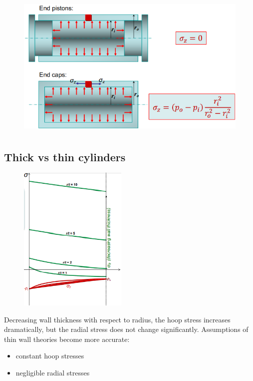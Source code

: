 \documentclass[class=report, crop=false, 12pt,a4paper]{standalone}
\begin{document}
\begin{figure}[H]
    \centering
    \includegraphics[height = 7cm]{../img/diagram116.png}
    \caption{}
\end{figure}
\subsection{Thick vs thin cylinders}
\begin{figure}[H]
    \centering
    \includegraphics[height = 7cm]{../img/diagram117.png}
    \caption{}
\end{figure}
Decreasing wall thickness with respect to radius, the hoop stress increases dramatically, but the radial stress does not change significantly. Assumptions of thin wall theories become more accurate:
\begin{itemize}
    \item constant hoop stresses
    \item negligible radial stresses
\end{itemize}
\end{document}
